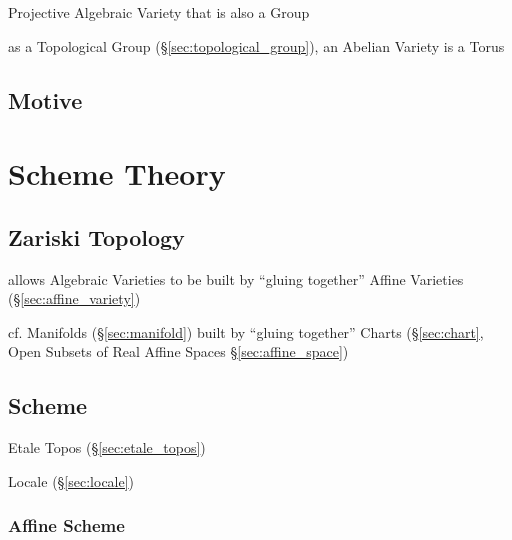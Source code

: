 Projective Algebraic Variety that is also a Group

as a Topological Group (\S\ref{sec:topological_group}), an Abelian Variety is a
Torus %



\subsection{Motive}\label{sec:motive}



\section{Scheme Theory}\label{sec:scheme_theory}

\subsection{Zariski Topology}\label{sec:zariski_topology}

allows Algebraic Varieties to be built by ``gluing together'' Affine Varieties
 (\S\ref{sec:affine_variety})

cf. Manifolds (\S\ref{sec:manifold}) built by ``gluing together'' Charts
(\S\ref{sec:chart}, Open Subsets of Real Affine Spaces
\S\ref{sec:affine_space})



\subsection{Scheme}\label{sec:scheme}

Etale Topos (\S\ref{sec:etale_topos})

Locale (\S\ref{sec:locale})



\subsubsection{Affine Scheme}\label{sec:affine_scheme}



